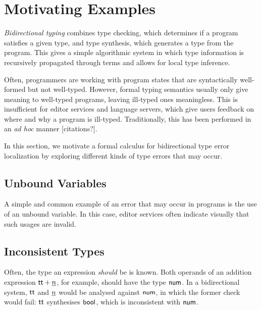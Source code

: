 
\section{Motivating Examples}
\emph{Bidirectional typing} combines type checking, which determines if a program satisfies a given
type, and type synthesis, which generates a type from the program. This gives a simple algorithmic
system in which type information is recursively propagated through terms and allows for local type
inference.


Often, programmers are working with program states that are syntactically well-formed but not
well-typed. However, formal typing semantics usually only give meaning to well-typed programs,
leaving ill-typed ones meaningless. This is insufficient for editor services and language servers,
which give users feedback on where and why a program is ill-typed. Traditionally, this has been
performed in an \emph{ad hoc} manner [citations?].


In this section, we motivate a formal calculus for bidirectional type error localization by
exploring different kinds of type errors that may occur.


\subsection{Unbound Variables}
A simple and common example of an error that may occur in programs is the use of an unbound
variable. In this case, editor services often indicate visually that such usages are invalid.


\subsection{Inconsistent Types}
Often, the type an expression \emph{should} be is known. Both operands of an addition expression
${\normalfont\textsf{tt}} + \underline{n}$, for example, should have the type ${\normalfont\textsf{num}}$. In a bidirectional system,
${\normalfont\textsf{tt}}$ and $\underline{n}$ would be analysed against ${\normalfont\textsf{num}}$, in which the former check would fail:
${\normalfont\textsf{tt}}$ synthesises ${\normalfont\textsf{bool}}$, which is inconsistent with ${\normalfont\textsf{num}}$.

